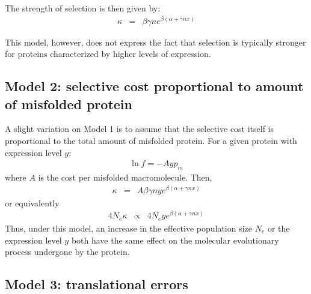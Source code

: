 \documentclass{article}
\begin{document}
The strength of selection is then given by:
\begin{eqnarray}
\kappa &=& \beta \gamma n e^{\beta(\alpha + \gamma n x)}
\end{eqnarray}

This model, however, does not express the fact that selection is typically stronger for proteins characterized by higher levels of expression. 

\subsection*{Model 2: selective cost proportional to amount of misfolded protein}

A slight variation on Model 1 is to assume that the selective cost itself is proportional to the total amount of misfolded protein. For a given protein with expression level $y$:
\begin{eqnarray}
\ln f = - A y p_m
\end{eqnarray}
where $A$ is the cost per misfolded macromolecule. Then, 
\begin{eqnarray}
\kappa &=& A \beta \gamma n y  e^{\beta(\alpha + \gamma n x)}
\end{eqnarray}
or equivalently
\begin{eqnarray}
4 N_e \kappa &\propto& 4 N_e y e^{\beta(\alpha + \gamma n x)}
\end{eqnarray}
Thus, under this model, an increase in the effective population size $N_e$ or the expression level $y$ both have the same effect on the molecular evolutionary process undergone by the protein.

\subsection*{Model 3: translational errors}
\end{document}
